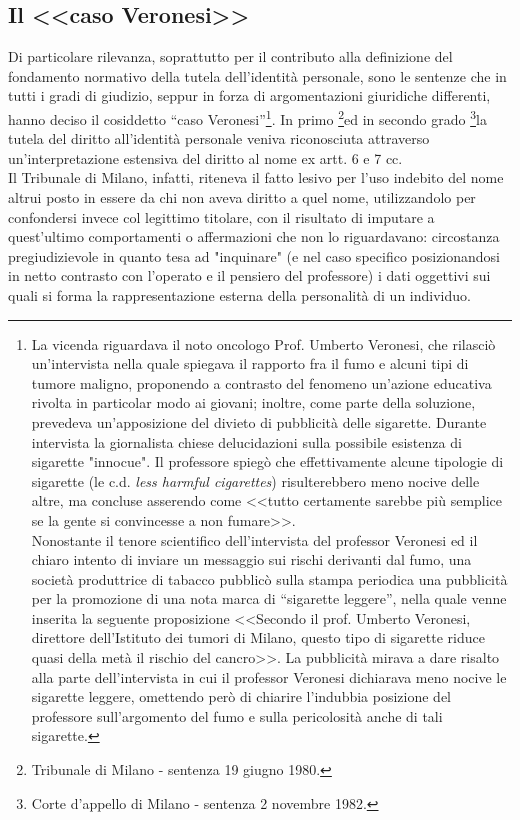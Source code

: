 \subsection{Il <<caso Veronesi>>}
Di particolare rilevanza, soprattutto per il contributo alla definizione del fondamento normativo della tutela dell’identità personale, sono le sentenze che in tutti i gradi di giudizio, seppur in forza di argomentazioni giuridiche differenti, hanno deciso il cosiddetto “caso Veronesi”\footnote{La vicenda riguardava il noto oncologo Prof. Umberto Veronesi, che  rilasciò un’intervista nella quale spiegava il rapporto fra il fumo e alcuni tipi di tumore maligno, proponendo a contrasto del fenomeno un'azione educativa rivolta in particolar modo ai giovani; inoltre, come parte della soluzione, prevedeva un'apposizione del divieto di pubblicità delle sigarette. Durante intervista la giornalista chiese delucidazioni sulla possibile esistenza di sigarette "innocue". Il professore spiegò che effettivamente alcune tipologie di sigarette (le c.d.\textit{ less harmful cigarettes}) risulterebbero meno nocive delle altre, ma concluse asserendo come <<tutto certamente sarebbe più semplice se la gente si convincesse a non fumare>>.\\Nonostante il tenore scientifico dell’intervista del professor Veronesi ed il chiaro intento di inviare un messaggio sui rischi derivanti dal fumo, una società produttrice di tabacco pubblicò sulla stampa periodica una pubblicità per la promozione di una nota marca di “sigarette leggere”, nella quale venne inserita la seguente proposizione <<Secondo il prof. Umberto Veronesi, direttore dell’Istituto dei tumori di Milano, questo tipo di sigarette riduce quasi della metà il rischio del cancro>>. La pubblicità mirava a dare risalto alla parte dell’intervista in cui il professor Veronesi dichiarava meno nocive le sigarette leggere, omettendo però di chiarire l'indubbia posizione del professore sull'argomento del fumo e sulla pericolosità anche di tali sigarette.}.
In primo \footnote{Tribunale di Milano - sentenza 19 giugno 1980.}ed in secondo grado \footnote{Corte d’appello di Milano - sentenza 2 novembre 1982.}la tutela del diritto all’identità personale veniva riconosciuta attraverso un’interpretazione estensiva del diritto al nome ex artt. 6 e 7 cc.
\\Il Tribunale di Milano, infatti, riteneva il fatto lesivo per l’uso indebito del nome altrui posto in essere da chi non aveva diritto a quel nome, utilizzandolo per confondersi invece col legittimo titolare, con il risultato di imputare a quest’ultimo comportamenti o affermazioni che non lo riguardavano: circostanza pregiudizievole in quanto tesa ad "inquinare" (e nel caso specifico posizionandosi in netto contrasto con l'operato e il pensiero del professore) i dati oggettivi sui quali si forma la rappresentazione esterna della personalità di un individuo. 
